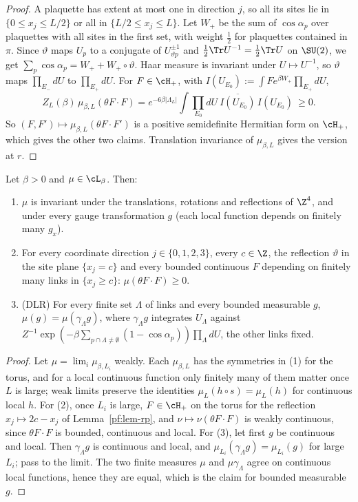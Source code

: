\begin{proof}
A plaquette has extent at most one in direction $j$, so all its sites lie in $\{0\le x_j\le L/2\}$ or all in $\{L/2\le x_j\le L\}$. Let $W_+$ be the sum of $\cos\alpha_p$ over plaquettes with all sites in the first set, with weight $\tfrac12$ for plaquettes contained in $\pi$. Since $\vartheta$ maps $U_p$ to a conjugate of $U_{\vartheta p}^{\pm1}$ and $\tfrac12\Tr U^{-1}=\tfrac12\Tr U$ on $\SU(2)$, we get $\sum_p\cos\alpha_p=W_++W_+\circ\vartheta$. Haar measure is invariant under $U\mapsto U^{-1}$, so $\vartheta$ maps $\prod_{E_-}dU$ to $\prod_{E_+}dU$. For $F\in\cH_+$, with $I(U_{E_0}):=\int F e^{\beta W_+}\prod_{E_+}dU$,
\[
Z_L(\beta)\,\mu_{\beta,L}(\theta F\cdot F)=e^{-6\beta|\Lambda_L|}\int\prod_{E_0}dU\ \overline{I(U_{E_0})}\,I(U_{E_0})\ \ge0 .
\]
So $(F,F')\mapsto\mu_{\beta,L}(\theta F\cdot F')$ is a positive semidefinite Hermitian form on $\cH_+$, which gives the other two claims. Translation invariance of $\mu_{\beta,L}$ gives the version at $r$.
\end{proof}

\begin{lemma}\label{pf:lem-limit}
Let $\beta>0$ and $\mu\in\cL_\beta$. Then:
\begin{enumerate}
\item $\mu$ is invariant under the translations, rotations and reflections of $\Z^4$, and under every gauge transformation $g$ (each local function depends on finitely many $g_x$).
\item For every coordinate direction $j\in\{0,1,2,3\}$, every $c\in\Z$, the reflection $\vartheta$ in the site plane $\{x_j=c\}$ and every bounded continuous $F$ depending on finitely many links in $\{x_j\ge c\}$: $\mu(\theta F\cdot F)\ge0$.
\item (DLR) For every finite set $\Lambda$ of links and every bounded measurable $g$, $\mu(g)=\mu(\gamma_\Lambda g)$, where $\gamma_\Lambda g$ integrates $U_\Lambda$ against $Z^{-1}\exp(-\beta\sum_{p\cap\Lambda\ne\emptyset}(1-\cos\alpha_p))\prod_\Lambda dU$, the other links fixed.
\end{enumerate}
\end{lemma}

\begin{proof}
Let $\mu=\lim_i\mu_{\beta,L_i}$ weakly. Each $\mu_{\beta,L}$ has the symmetries in (1) for the torus, and for a local continuous function only finitely many of them matter once $L$ is large; weak limits preserve the identities $\mu_L(h\circ s)=\mu_L(h)$ for continuous local $h$. For (2), once $L_i$ is large, $F\in\cH_+$ on the torus for the reflection $x_j\mapsto2c-x_j$ of Lemma~\ref{pf:lem-rp}, and $\nu\mapsto\nu(\theta F\cdot F)$ is weakly continuous, since $\theta F\cdot F$ is bounded, continuous and local. For (3), let first $g$ be continuous and local. Then $\gamma_\Lambda g$ is continuous and local, and $\mu_{L_i}(\gamma_\Lambda g)=\mu_{L_i}(g)$ for large $L_i$; pass to the limit. The two finite measures $\mu$ and $\mu\gamma_\Lambda$ agree on continuous local functions, hence they are equal, which is the claim for bounded measurable $g$.
\end{proof}

